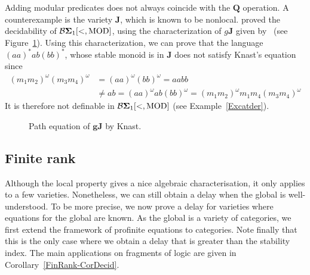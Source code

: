 \documentclass[submission,hidelink]{dmtcs-episciences}
\newcommand{\J}{\mathbf{J}}
\newcommand{\BS}{\mathbf{{\cal B}\Sigma}}
\newcommand{\MOD}{\mathrm{MOD}}
\begin{document}
		Adding modular predicates does not always coincide with the $\mathbf{Q}$ operation.
		A counterexample is the variety $\J$, which is known to be nonlocal.
		\cite{CPS06b} proved the decidability of $\BS_1[<,\MOD]$, using the
		characterization of $g\J$ given by~\cite{Kna83} (see Figure~\ref{gJ}).
		Using this characterization, we can prove that the language $(aa)^*ab(bb)^*$,
		whose stable monoid is in $\J$ does not satisfy Knast's equation since
		\begin{align*}
		(m_1m_2)^\omega (m_3m_4)^\omega&=(aa)^\omega(bb)^\omega=aabb\\
		&\neq ab =(aa)^\omega ab(bb)^\omega= (m_1m_2)^\omega m_1m_4(m_3m_4)^\omega
		\end{align*}
		It is therefore not definable in $\BS_1[<,\MOD]$ (see Example~\ref{Excatder}).
\begin{figure}[H]
\centering
{}
\caption{Path equation of $\mathbf{g}\J$ by Knast. }\label{gJ}
\end{figure}


\subsection{Finite rank}\label{Subsection:FiniteRank}


Although the local property gives a nice algebraic characterisation, it only applies to a few varieties.
Nonetheless, we can still obtain a delay when the global is well-understood.
To be more precise, we now prove a delay for varieties where equations for the global are known.
As the global is a variety of categories, we first extend the framework of profinite equations to categories.
Note finally that this is the only case where we obtain a delay that is greater than the stability index.
The main applications on fragments of logic are given in Corollary~\ref{FinRank-CorDecid}.
\end{document}
